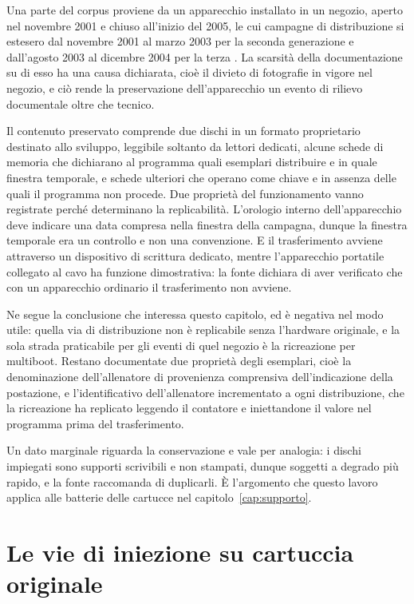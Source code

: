 Una parte del corpus proviene da un apparecchio installato in un negozio, aperto nel novembre 2001 e chiuso all'inizio del 2005, le cui campagne di distribuzione si estesero dal novembre 2001 al marzo 2003 per la seconda generazione e dall'agosto 2003 al dicembre 2004 per la terza \cite{video-pcny}. La scarsità della documentazione su di esso ha una causa dichiarata, cioè il divieto di fotografie in vigore nel negozio, e ciò rende la preservazione dell'apparecchio un evento di rilievo documentale oltre che tecnico.

Il contenuto preservato comprende due dischi in un formato proprietario destinato allo sviluppo, leggibile soltanto da lettori dedicati, alcune schede di memoria che dichiarano al programma quali esemplari distribuire e in quale finestra temporale, e schede ulteriori che operano come chiave e in assenza delle quali il programma non procede. Due proprietà del funzionamento vanno registrate perché determinano la replicabilità. L'orologio interno dell'apparecchio deve indicare una data compresa nella finestra della campagna, dunque la finestra temporale era un controllo e non una convenzione. E il trasferimento avviene attraverso un dispositivo di scrittura dedicato, mentre l'apparecchio portatile collegato al cavo ha funzione dimostrativa: la fonte dichiara di aver verificato che con un apparecchio ordinario il trasferimento non avviene.

Ne segue la conclusione che interessa questo capitolo, ed è negativa nel modo utile: quella via di distribuzione non è replicabile senza l'hardware originale, e la sola strada praticabile per gli eventi di quel negozio è la ricreazione per multiboot. Restano documentate due proprietà degli esemplari, cioè la denominazione dell'allenatore di provenienza comprensiva dell'indicazione della postazione, e l'identificativo dell'allenatore incrementato a ogni distribuzione, che la ricreazione ha replicato leggendo il contatore e iniettandone il valore nel programma prima del trasferimento.

Un dato marginale riguarda la conservazione e vale per analogia: i dischi impiegati sono supporti scrivibili e non stampati, dunque soggetti a degrado più rapido, e la fonte raccomanda di duplicarli. È l'argomento che questo lavoro applica alle batterie delle cartucce nel capitolo~\ref{cap:supporto}.

\section{Le vie di iniezione su cartuccia originale}

